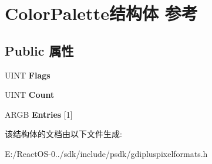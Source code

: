 \hypertarget{struct_color_palette}{}\section{Color\+Palette结构体 参考}
\label{struct_color_palette}
\subsection*{Public 属性}
\begin{DoxyCompactItemize}
\item 
\mbox{\label{struct_color_palette_adef6f94c05e445f72ad509f197912ef8}} 
U\+I\+NT {\bfseries Flags}
\item 
\mbox{\label{struct_color_palette_a2f53099aa6b01f654ebb26a8a506050b}} 
U\+I\+NT {\bfseries Count}
\item 
\mbox{\label{struct_color_palette_a274c8f792ba6af1a3bd915bd104fc3b4}} 
A\+R\+GB {\bfseries Entries} \mbox{[}1\mbox{]}
\end{DoxyCompactItemize}


该结构体的文档由以下文件生成\+:\begin{DoxyCompactItemize}
\item 
E\+:/\+React\+O\+S-\/0../sdk/include/psdk/gdipluspixelformats.\+h\end{DoxyCompactItemize}
